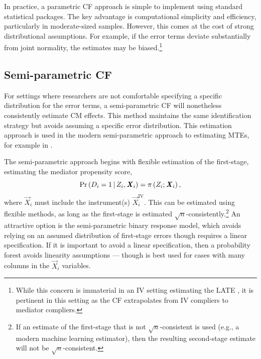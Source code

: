 In practice, a parametric CF approach is simple to implement using standard statistical packages.
The key advantage is computational simplicity and efficiency, particularly in moderate-sized samples.
However, this comes at the cost of strong distributional assumptions.
For example, if the error terms deviate substantially from joint normality, the estimates may be biased.\footnote{
    While this concern is immaterial in an IV setting estimating the LATE \citep{kline2019heckits}, it is pertinent in this setting as the CF extrapolates from IV compliers to mediator compliers.
}

\subsection{Semi-parametric CF}
\label{sec:semiparametric-cf}
For settings where researchers are not comfortable specifying a specific distribution for the error terms, a semi-parametric CF will nonetheless consistently estimate CM effects.
This method maintains the same identification strategy but avoids assuming a specific error distribution.
This estimation approach is used in the modern semi-parametric approach to estimating MTEs, for example in \cite{brinch2017beyond,heckman2007econometric}.

The semi-parametric approach begins with flexible estimation of the first-stage, estimating the mediator propensity score,
\[ \Pr\left( D_i = 1 \, \middle\vert \, Z_i, \boldsymbol{\mathit{X}}_i \right)
    = \pi\left(Z_i; \boldsymbol{\mathit{X}}_i \right), \]
where $\vec X_i$ must include the instrument(s) $\vec X_i^{\text{IV}}$.
This can be estimated using flexible methods, as long as the first-stage is estimated $\sqrt{n}$-consistently.\footnote{
    If an estimate of the first-stage that is not $\sqrt{n}$-consistent is used (e.g., a modern machine learning estimator), then the resulting second-stage estimate will not be $\sqrt{n}$-consistent.
}
An attractive option is the \cite{klein1993efficient} semi-parametric binary response model, which avoids relying on an assumed distribution of first-stage errors though requires a linear specification.
If it is important to avoid a linear specification, then a probability forest avoids linearity assumptions \citep{athey2019generalized} --- though is best used for cases with many columns in the $\vec X_i$ variables.

